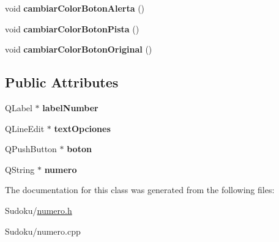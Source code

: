 \begin{DoxyCompactItemize}
\item 
\hypertarget{class_numero_a8a2040801509a6563189dac2a6618372}{void {\bfseries cambiar\-Color\-Boton\-Alerta} ()}\label{class_numero_a8a2040801509a6563189dac2a6618372}

\item 
\hypertarget{class_numero_a1492e35dd63ed7c2a0b6505f755fbf28}{void {\bfseries cambiar\-Color\-Boton\-Pista} ()}\label{class_numero_a1492e35dd63ed7c2a0b6505f755fbf28}

\item 
\hypertarget{class_numero_a8508989f8472de04dd6a4509d1e15814}{void {\bfseries cambiar\-Color\-Boton\-Original} ()}\label{class_numero_a8508989f8472de04dd6a4509d1e15814}

\end{DoxyCompactItemize}
\subsection*{Public Attributes}
\begin{DoxyCompactItemize}
\item 
\hypertarget{class_numero_ae868309035237d255665cc47e11f358e}{Q\-Label $\ast$ {\bfseries label\-Number}}\label{class_numero_ae868309035237d255665cc47e11f358e}

\item 
\hypertarget{class_numero_a05c25be5d0eec99f68ecee2d362a1006}{Q\-Line\-Edit $\ast$ {\bfseries text\-Opciones}}\label{class_numero_a05c25be5d0eec99f68ecee2d362a1006}

\item 
\hypertarget{class_numero_a72aae20a1d5d8722c9da4fa8e97d4efc}{Q\-Push\-Button $\ast$ {\bfseries boton}}\label{class_numero_a72aae20a1d5d8722c9da4fa8e97d4efc}

\item 
\hypertarget{class_numero_a47f3d0b00a7f0c276326be98accb8afa}{Q\-String $\ast$ {\bfseries numero}}\label{class_numero_a47f3d0b00a7f0c276326be98accb8afa}

\end{DoxyCompactItemize}


The documentation for this class was generated from the following files\-:\begin{DoxyCompactItemize}
\item 
Sudoku/\hyperlink{numero_8h}{numero.\-h}\item 
Sudoku/numero.\-cpp\end{DoxyCompactItemize}
